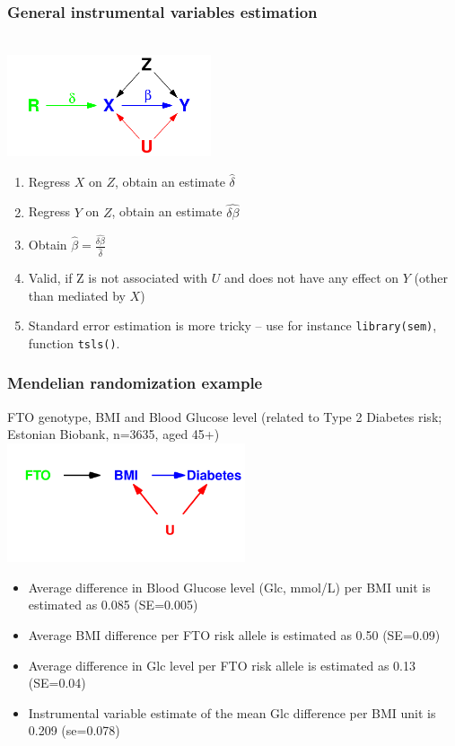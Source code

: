 \documentclass[xcolor=svgnames,handout]{beamer}
\newcommand{\code}[1]{\texttt{#1}}
\begin{document}
\begin{frame}
 \frametitle{General instrumental variables estimation}
\mbox{ }\\[-1cm]
\includegraphics[width=6cm]{instvar}\\
\begin{enumerate}
\item Regress $X$ on $Z$, obtain an estimate $\hat{\delta}$
\item Regress $Y$ on $Z$, obtain an estimate $\hat{\delta\beta}$ 
\item Obtain $\hat{\beta} = \frac{\hat{\delta\beta}}{\hat{\delta}}$
\item \alert{Valid, if Z is not associated with $U$ and does not have any effect on $Y$ (other than mediated by $X$)} 
\small
\item Standard error estimation is more tricky -- use for instance \code{library(sem)}, function \code{tsls()}.
\end{enumerate}
\normalsize
\end{frame}
\begin{frame}
 \frametitle{Mendelian randomization example}
 FTO genotype, BMI and Blood Glucose level (related to Type 2 Diabetes risk; Estonian Biobank, n=3635, aged 45+)
\mbox{ }\\[-0.5cm]
\includegraphics[width=7cm]{mendrand}\\[-0.5cm]
\begin{itemize}
\item Average difference in Blood Glucose level (Glc, mmol/L) per BMI unit is estimated as 0.085 (SE=0.005)
\item Average BMI difference per FTO risk allele is estimated as 0.50 (SE=0.09)
\item Average difference in Glc level per  FTO risk allele is estimated as 0.13 (SE=0.04)
\item \alert{ Instrumental variable estimate of the mean Glc difference per BMI unit is 0.209 (se=0.078)}
\end{itemize}
\end{frame}
\end{document}

